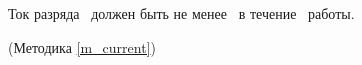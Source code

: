 Ток разряда \dut \ должен быть не менее \current \ в течение \work \ работы.

\begin{flushright}
(Методика \ref{m_current})
\end{flushright}

